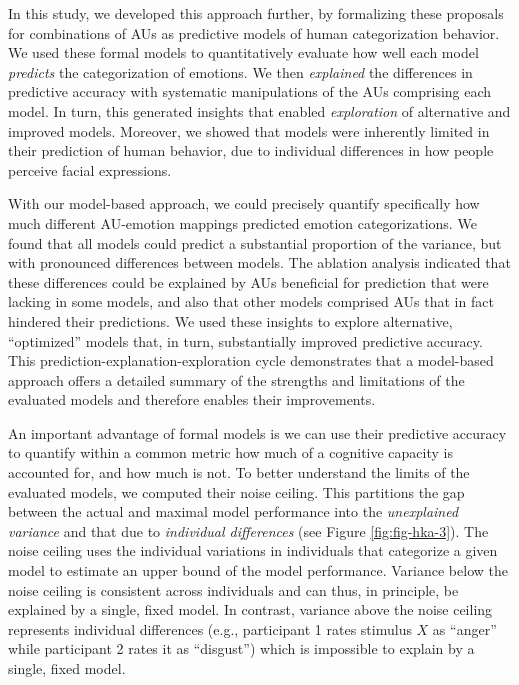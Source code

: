 \documentclass[12pt,american,a4paper,oneside,]{memoir} %
\begin{document}
In this study, we developed this approach further, by formalizing these proposals for combinations of AUs as predictive models of human categorization behavior. We used these formal models to quantitatively evaluate how well each model \emph{predicts} the categorization of emotions. We then \emph{explained} the differences in predictive accuracy with systematic manipulations of the AUs comprising each model. In turn, this generated insights that enabled \emph{exploration} of alternative and improved models. Moreover, we showed that models were inherently limited in their prediction of human behavior, due to individual differences in how people perceive facial expressions.

With our model-based approach, we could precisely quantify specifically how much different AU-emotion mappings predicted emotion categorizations. We found that all models could predict a substantial proportion of the variance, but with pronounced differences between models. The ablation analysis indicated that these differences could be explained by AUs beneficial for prediction that were lacking in some models, and also that other models comprised AUs that in fact hindered their predictions. We used these insights to explore alternative, ``optimized'' models that, in turn, substantially improved predictive accuracy. This prediction-explanation-exploration cycle demonstrates that a model-based approach offers a detailed summary of the strengths and limitations of the evaluated models and therefore enables their improvements.

An important advantage of formal models is we can use their predictive accuracy to quantify within a common metric how much of a cognitive capacity is accounted for, and how much is not. To better understand the limits of the evaluated models, we computed their noise ceiling. This partitions the gap between the actual and maximal model performance into the \emph{unexplained variance} and that due to \emph{individual differences} (see Figure \ref{fig:fig-hka-3}). The noise ceiling uses the individual variations in individuals that categorize a given model to estimate an upper bound of the model performance. Variance below the noise ceiling is consistent across individuals and can thus, in principle, be explained by a single, fixed model. In contrast, variance above the noise ceiling represents individual differences (e.g., participant 1 rates stimulus \(X\) as ``anger'' while participant 2 rates it as ``disgust'') which is impossible to explain by a single, fixed model.
\end{document}
